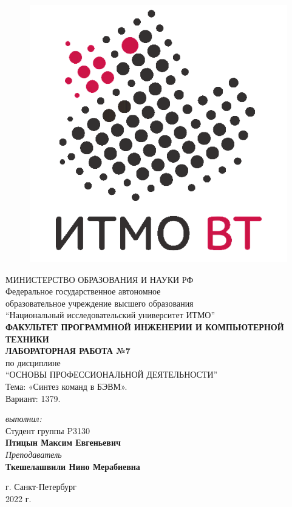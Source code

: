 \begin{center}

	\begin{figure}[H]
	\centering
	\includegraphics[scale=0.37]{img/sticker_dark}
	\end{figure}
	\hfill \break
	МИНИСТЕРСТВО ОБРАЗОВАНИЯ И НАУКИ РФ\\
	\hfill \break
	Федеральное государственное автономное\\
	образовательное учреждение высшего образования\\
	``Национальный исследовательский университет ИТМО''\\
	\hfill \break
	\textbf{ФАКУЛЬТЕТ ПРОГРАММНОЙ ИНЖЕНЕРИИ И КОМПЬЮТЕРНОЙ ТЕХНИКИ}\\
	\vspace{2cm}
	\large{\textbf{ЛАБОРАТОРНАЯ РАБОТА №7}}\\
	\hfill \break
	по дисциплине\\
	\large{``ОСНОВЫ ПРОФЕССИОНАЛЬНОЙ ДЕЯТЕЛЬНОСТИ''}\\
	Тема: «Синтез команд в БЭВМ».\\
	\hfill \break
	Вариант: 1379.
	\vspace{3cm}
	\begin{flushright}
	\textit{выполнил:}\\
	Студент группы P3130\\
	\textbf{Птицын Максим Евгеньевич}\\
	\textit{Преподаватель}\\
	\textbf{Ткешелашвили Нино Мерабиевна}
	\end{flushright}
\end{center}

\vfill

\begin{center} г. Санкт-Петербург\\2022 г.
\end{center}

\thispagestyle{empty}
\newpage